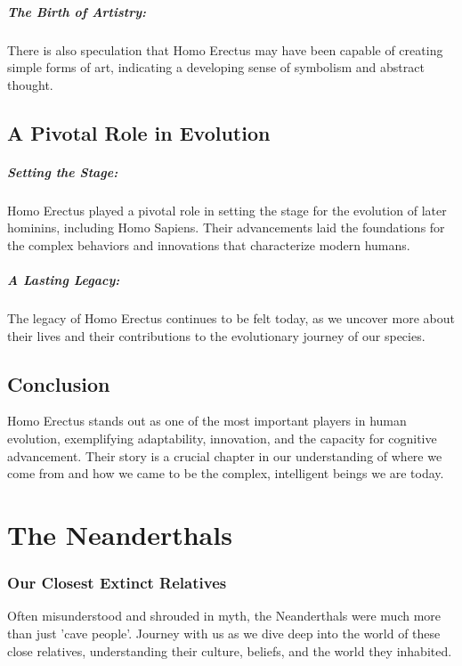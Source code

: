 \documentclass[a4paper,12pt]{book}
\begin{document}
\paragraph{The Birth of Artistry:}
There is also speculation that Homo Erectus may have been capable of creating simple forms of art, indicating a developing sense of symbolism and abstract thought.

\section*{A Pivotal Role in Evolution}

\paragraph{Setting the Stage:}
Homo Erectus played a pivotal role in setting the stage for the evolution of later hominins, including Homo Sapiens. Their advancements laid the foundations for the complex behaviors and innovations that characterize modern humans.

\paragraph{A Lasting Legacy:}
The legacy of Homo Erectus continues to be felt today, as we uncover more about their lives and their contributions to the evolutionary journey of our species.

\section*{Conclusion}

Homo Erectus stands out as one of the most important players in human evolution, exemplifying adaptability, innovation, and the capacity for cognitive advancement. Their story is a crucial chapter in our understanding of where we come from and how we came to be the complex, intelligent beings we are today.

\chapter{The Neanderthals}
\subsection*{Our Closest Extinct Relatives}
Often misunderstood and shrouded in myth, the Neanderthals were much more than just 'cave people'. Journey with us as we dive deep into the world of these close relatives, understanding their culture, beliefs, and the world they inhabited.
\end{document}
